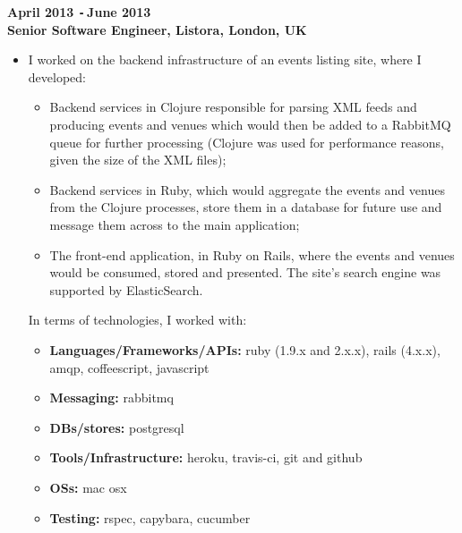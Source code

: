 \documentclass{res}
\def\Minus{\texttt{-}\,}
\begin{document}
\begin{resume}
  {\bf April 2013 \Minus June 2013}\\
  {\bf Senior Software Engineer, Listora, London, UK}
    \begin{itemize} %
      \item[] I worked on the backend infrastructure of an events listing site,
      where I developed:
      \begin{itemize}
        \item Backend services in Clojure responsible for parsing XML feeds and
        producing events and venues which would then be added to a RabbitMQ
        queue for further processing (Clojure was used for performance reasons,
        given the size of the XML files);
        \item Backend services in Ruby, which would aggregate the events and
        venues from the Clojure processes, store them in a database for future
        use and message them across to the main application;
        \item The front-end application, in Ruby on Rails, where the events and
        venues would be consumed, stored and presented. The site's search
        engine was supported by ElasticSearch.
      \end{itemize}
      In terms of technologies, I worked with:
      \begin{itemize}
        \item[] {\bf Languages/Frameworks/APIs:} ruby (1.9.x and 2.x.x), rails
          (4.x.x), amqp, coffeescript, javascript
        \item[] {\bf Messaging:} rabbitmq
        \item[] {\bf DBs/stores:} postgresql
        \item[] {\bf Tools/Infrastructure:} heroku, travis-ci, git and github
        \item[] {\bf OSs:} mac osx
        \item[] {\bf Testing:} rspec, capybara, cucumber
      \end{itemize}
    \end{itemize}


\end{resume}
\end{document}
